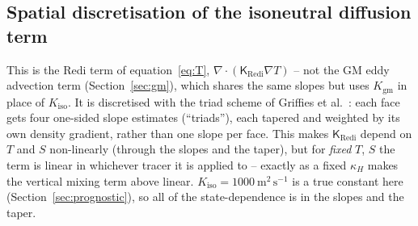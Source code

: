 \documentclass{article}
\begin{document}
\subsection{Spatial discretisation of the isoneutral diffusion term}\label{sec:iso}

This is the Redi term of equation~\eqref{eq:T}, $\nabla\cdot(\mathsf{K}_\text{Redi}\nabla T)$ -- not the GM eddy advection term (Section~\ref{sec:gm}), which shares the same slopes but uses $K_\text{gm}$ in place of $K_\text{iso}$.
It is discretised with the triad scheme of Griffies et al.\ \citep{griffies1998}: each face gets four one-sided slope estimates (``triads''), each tapered and weighted by its own density gradient, rather than one slope per face.
This makes $\mathsf{K}_\text{Redi}$ depend on $T$ and $S$ non-linearly (through the slopes and the taper), but for \emph{fixed} $T$, $S$ the term is linear in whichever tracer it is applied to -- exactly as a fixed $\kappa_H$ makes the vertical mixing term above linear.
$K_\text{iso} = 1000~\text{m}^2\,\text{s}^{-1}$ is a true constant here (Section~\ref{sec:prognostic}), so all of the state-dependence is in the slopes and the taper.
\end{document}
